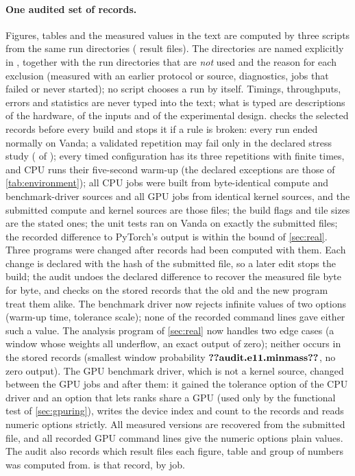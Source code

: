 \begin{sloppypar}
\paragraph{One audited set of records.} Figures, tables and the measured values in
the text are computed by three scripts from the same  run directories
( result files). The directories are named explicitly in
, together with the  run
directories that are \emph{not} used and the reason for each exclusion (measured
with an earlier protocol or source, diagnostics, jobs that failed or never started);
no script chooses a run by itself. Timings, throughputs, errors and statistics are
never typed into the text; what is typed are descriptions of the hardware, of the
inputs and of the experimental design.  checks the
selected records before every build and stops it if a rule is broken: every run
ended normally on Vanda; a validated repetition may fail only in the declared
stress study ( of ); every timed configuration
has its three repetitions with finite times, and CPU runs their five-second warm-up
(the declared exceptions are those of \cref{tab:environment}); all CPU jobs were
built from byte-identical compute and benchmark-driver sources and all GPU jobs
from identical kernel sources, and the submitted compute and kernel sources are
those files; the build flags and tile sizes are the stated ones; the unit tests ran
on Vanda on exactly the submitted files; the recorded difference to PyTorch's
output is within the bound of \cref{sec:real}. Three programs were changed after
records had been computed with them. Each change is declared with the hash of the
submitted file, so a later edit stops the build; the audit undoes the declared
difference to recover the measured file byte for byte, and checks on the stored
records that the old and the new program treat them alike. The benchmark driver now
rejects infinite values of two options (warm-up time, tolerance scale); none of the
 recorded command lines gave either such a value. The
analysis program of \cref{sec:real} now handles two edge cases (a window whose
weights all underflow, an exact output of zero); neither occurs in the
 stored records (smallest window probability
$\n{audit.e11.minmass}$, no zero output). The GPU benchmark driver, which is not a
kernel source, changed between the GPU jobs and after them: it gained the
tolerance option of the CPU driver and an option that lets ranks share a GPU (used
only by the functional test of \cref{sec:gpuring}), writes the device index and
count to the records and reads numeric options strictly. All
 measured versions are recovered from the submitted
file, and all  recorded GPU command lines give the
numeric options plain values. The audit also records which result
files each figure, table and group of numbers was computed from.
 is that record, by job.
\end{sloppypar}

